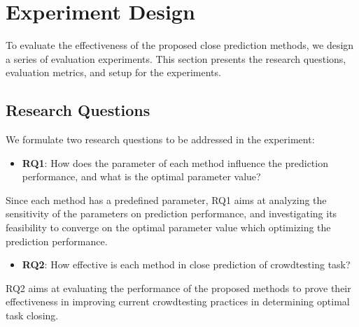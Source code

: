 \documentclass[sigconf,review, anonymous]{acmart}
\begin{document}
\section{Experiment Design}
\label{sec:experiment}

To evaluate the effectiveness of the proposed close prediction methods, we design a series of evaluation experiments. This section presents the research questions, evaluation metrics, and setup for the experiments.


\subsection{Research Questions}
\label{subsec:design_rq}

We formulate two research questions to be addressed in the experiment:

\begin{itemize}
\item \textbf{RQ1}: How does the parameter of each method influence the prediction performance, and what is the optimal parameter value?
\end{itemize}

Since each method has a predefined parameter, RQ1 aims at analyzing the sensitivity of the  parameters on prediction performance, and investigating its feasibility to converge on the optimal parameter value which optimizing the prediction performance. 

\begin{itemize}
\item \textbf{RQ2}: How effective is each method in close prediction of crowdtesting task?
\end{itemize}

RQ2 aims at evaluating the performance of the proposed methods to prove their effectiveness in improving current crowdtesting practices in determining optimal task closing.


\end{document}
